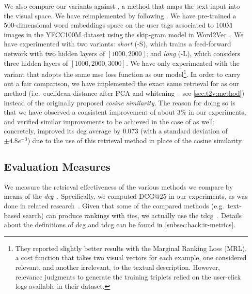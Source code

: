 We also compare our \ttv{} variants against \wordvisual{} \cite{dong2018predicting}, a method that maps the text input into the visual space. %
We have reimplemented \wordvisual{} by following \cite{dong2018predicting}.
We have pre-trained a 500-dimensional word embeddings space on the user tags associated to 100M images in the YFCC100M dataset \cite{thomee2016yfcc100m} using the skip-gram model in Word2Vec~\cite{mikolov2013distributed}.
We have experimented with two variants: \emph{short} (\wordvisual{}-S), which trains a feed-forward network with two hidden layers of $[1000, 2000]$; and \emph{long} (\wordvisual{}-L), which considers three hidden layers of $[1000, 2000, 3000]$.
We have only experimented with the variant that adopts the same \gls{mse} loss function as our model\footnote{They reported slightly better results with the Marginal Ranking Loss (MRL), a cost function that takes two visual vectors for each example, one considered relevant, and another irrelevant, to the textual description. However, relevance judgments to generate the training triplets relied on the user-click logs available in their dataset.}. %
In order to carry out a fair comparison, we have implemented the exact same retrieval for \wordvisual{} as our method (i.e.\ euclidean distance after PCA and whitening -- see \ref{sec:t2v:method}) instead of the originally proposed \emph{cosine similarity}.
The reason for doing so is that we have observed a consistent improvement of about 3\% in our experiments, and verified similar improvements to be achieved in the case of \wordvisual{} as well;
concretely, \wordvisual{} improved its \gls{dcg} average by 0.073 (with a standard deviation of $\pm4.8e^{-3}$) due to the use of this retrieval method in place of the cosine similarity.

\subsection{Evaluation Measures}
\label{subsec:t2v:eval}

We measure the retrieval effectiveness of the various methods we compare by means of the \emph{\acrfull{dcg}}~\cite{jarvelin2002cumulated}.
%
%
Specifically, we computed $\mathrm{DCG}@25$ in our experiments, as was done in related research~\cite{hua2013clickage,dong2018predicting}.
Given that some of the compared methods (e.g.\ text-based search) can produce rankings with ties, we actually use the \gls{tdcg}~\cite{mcsherry2008computing}.
Details about the definitions of \gls{dcg} and \gls{tdcg} can be found in \ref{subsec:back:ir-metrics}.

